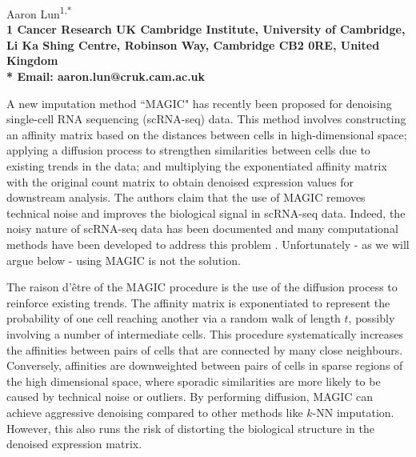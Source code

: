 \documentclass[10pt,letterpaper]{article}
\begin{document}
\vspace*{0.35in}

\begin{flushleft}
{\Large
    \textbf{}
}
\newline

Aaron Lun\textsuperscript{1,*}
\\
\bigskip
\bf{1} Cancer Research UK Cambridge Institute, University of Cambridge, Li Ka Shing Centre, Robinson Way, Cambridge CB2 0RE, United Kingdom \\
\bigskip
* Email: aaron.lun@cruk.cam.ac.uk
\end{flushleft}

\noindent
A new imputation method ``MAGIC" \cite{vandijk2018recovering} has recently been proposed for denoising single-cell RNA sequencing (scRNA-seq) data.
This method involves constructing an affinity matrix based on the distances between cells in high-dimensional space;
applying a diffusion process to strengthen similarities between cells due to existing trends in the data;
and multiplying the exponentiated affinity matrix with the original count matrix to obtain denoised expression values for downstream analysis.
The authors claim that the use of MAGIC removes technical noise and improves the biological signal in scRNA-seq data.
Indeed, the noisy nature of scRNA-seq data has been documented \cite{grun2015design} and many computational methods have been developed to address this problem \cite{bacher2016design}.
Unfortunately - as we will argue below - using MAGIC is not the solution.

The raison d'\^etre of the MAGIC procedure is the use of the diffusion process to reinforce existing trends.
The affinity matrix is exponentiated to represent the probability of one cell reaching another via a random walk of length $t$, possibly involving a number of intermediate cells.
This procedure systematically increases the affinities between pairs of cells that are connected by many close neighbours.
Conversely, affinities are downweighted between pairs of cells in sparse regions of the high dimensional space, 
where sporadic similarities are more likely to be caused by technical noise or outliers.
By performing diffusion, MAGIC can achieve aggressive denoising compared to other methods like $k$-NN imputation.
However, this also runs the risk of distorting the biological structure in the denoised expression matrix.
\end{document}
